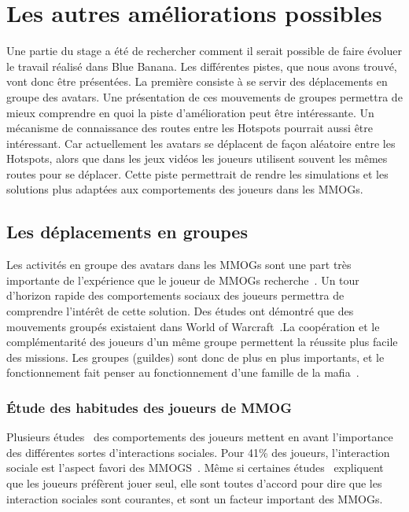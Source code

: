 \newpage
\section{Les autres améliorations possibles}

Une partie du stage a été de rechercher comment il serait possible de faire évoluer le travail réalisé dans Blue Banana. Les différentes pistes, que nous avons trouvé, vont donc être présentées. La première consiste à se servir des déplacements en groupe des avatars. Une présentation de ces mouvements de groupes permettra de mieux comprendre en quoi la piste d'amélioration peut être intéressante. Un mécanisme de connaissance des routes entre les Hotspots pourrait aussi être intéressant. Car actuellement les avatars se déplacent de façon aléatoire entre les Hotspots, alors que  dans les jeux vidéos les joueurs utilisent souvent les mêmes routes pour se déplacer. Cette piste permettrait de rendre les simulations et les solutions plus adaptées aux comportements des joueurs dans les MMOGs.

\subsection{Les déplacements en groupes}

Les activités en groupe des avatars dans les MMOGs sont une part très importante de l'expérience que le joueur de MMOGs recherche~\cite{1501834,1255052}. Un tour d'horizon rapide des comportements sociaux des joueurs permettra de comprendre l'intérêt de cette solution. Des études ont démontré que des mouvements groupés existaient dans World of Warcraft~\cite{15141312}.La coopération et le complémentarité des joueurs d'un même groupe permettent la réussite plus facile des missions. Les groupes (guildes) sont donc de plus en plus importants, et le fonctionnement fait penser au fonctionnement d'une famille de la mafia~\cite{Jakobsson03thesopranos}.


\subsubsection{Étude des habitudes des joueurs de MMOG}

Plusieurs études~\cite{BreakingSteretype,1159988,1255052,StudyEQ} des comportements des joueurs mettent en avant l'importance des différentes sortes d'interactions sociales. Pour 41\% des joueurs, l'interaction sociale est l'aspect favori des MMOGS~\cite{BreakingSteretype}. Même si certaines études~\cite{1124834,1031667} expliquent que les joueurs préfèrent jouer seul, elle sont toutes d'accord pour dire que les interaction sociales sont courantes, et sont un facteur important des MMOGs. 


